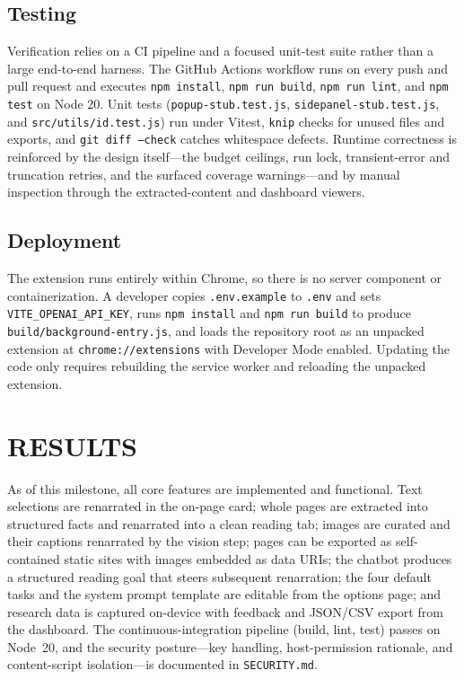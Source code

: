 \documentclass[a4paper,12pt]{report}
\begin{document}
\section{Testing}
Verification relies on a CI pipeline and a focused unit-test suite rather than a
large end-to-end harness. The GitHub Actions workflow runs on every push and pull
request and executes \texttt{npm install}, \texttt{npm run build},
\texttt{npm run lint}, and \texttt{npm test} on Node 20. Unit tests
(\texttt{popup-stub.test.js}, \texttt{sidepanel-stub.test.js}, and
\texttt{src/utils/id.test.js}) run under Vitest, \texttt{knip} checks for unused
files and exports, and \texttt{git diff --check} catches whitespace defects.
Runtime correctness is reinforced by the design itself---the budget ceilings,
run lock, transient-error and truncation retries, and the surfaced coverage
warnings---and by manual inspection through the extracted-content and dashboard
viewers.

\section{Deployment}
The extension runs entirely within Chrome, so there is no server component or
containerization. A developer copies \texttt{.env.example} to \texttt{.env} and
sets \texttt{VITE\_OPENAI\_API\_KEY}, runs \texttt{npm install} and
\texttt{npm run build} to produce \texttt{build/background-entry.js}, and loads
the repository root as an unpacked extension at \texttt{chrome://extensions} with
Developer Mode enabled. Updating the code only requires rebuilding the service
worker and reloading the unpacked extension.

\chapter{RESULTS}
As of this milestone, all core features are implemented and functional. Text
selections are renarrated in the on-page card; whole pages are extracted into
structured facts and renarrated into a clean reading tab; images are curated and
their captions renarrated by the vision step; pages can be exported as
self-contained static sites with images embedded as data URIs; the chatbot
produces a structured reading goal that steers subsequent renarration; the four
default tasks and the system prompt template are editable from the options page;
and research data is captured on-device with feedback and JSON/CSV export from the
dashboard. The continuous-integration pipeline (build, lint, test) passes on
Node~20, and the security posture---key handling, host-permission rationale, and
content-script isolation---is documented in \texttt{SECURITY.md}.
\end{document}

